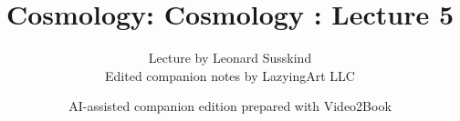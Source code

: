 \documentclass[11pt,oneside]{book}
\begin{document}
\frontmatter
\title{Cosmology: Cosmology : Lecture 5}
\author{Lecture by Leonard Susskind\\Edited companion notes by LazyingArt LLC}
\date{AI-assisted companion edition prepared with Video2Book}
\maketitle
\clearpage
\mainmatter

\end{document}
